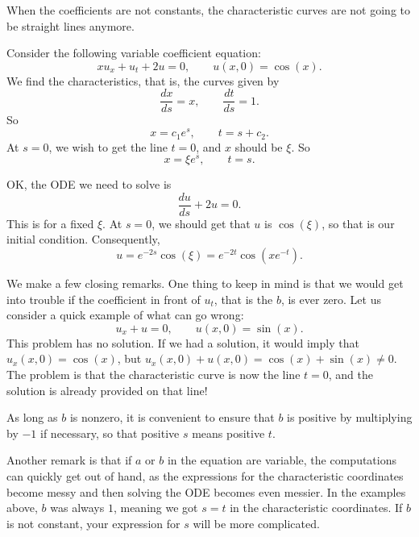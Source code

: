 When the coefficients are not constants, the characteristic curves
are not going to be straight lines anymore.

\begin{example}
Consider the following variable coefficient equation:
\begin{equation*}
x u_x + u_t + 2 u = 0, \qquad u(x,0) = \cos(x) . %
\end{equation*}
We find the characteristics, that is, the curves given by
\begin{equation*}
\frac{dx}{ds} = x, \qquad \frac{dt}{ds} = 1 .
\end{equation*}
So
\begin{equation*}
x = c_1 e^{s} , \qquad t = s+ c_2 .
\end{equation*}
At $s=0$, we wish to get the line $t=0$, and $x$ should be $\xi$.  So
\begin{equation*}
x = \xi e^s, \qquad t = s .
\end{equation*}

OK\@, the ODE we need to solve is
\begin{equation*}
\frac{du}{ds} + 2 u = 0 .
\end{equation*}
This is for a fixed $\xi$.  At $s=0$, we should get that $u$ is
$\cos(\xi)$, so that is our initial condition.  Consequently,
\begin{equation*}
u = e^{-2s} \cos(\xi)= e^{-2t} \cos(xe^{-t}) .
\end{equation*}
\end{example}


We make a few closing remarks.
One thing to keep in mind is that we would get into trouble if the
coefficient in front of $u_t$, that is the $b$, is ever zero.
Let us consider a quick example of what can go wrong:
\begin{equation*}
u_x + u = 0, \qquad u(x,0) = \sin(x).
\end{equation*}
This problem has no solution.  If we had a solution, it
would imply that $u_x(x,0) = \cos(x)$,
but $u_x(x,0) + u(x,0) = \cos(x) + \sin(x) \not= 0$.
The problem is that the characteristic curve is now the line $t=0$,
and the solution is already provided on that line!

As long as $b$ is nonzero,
it is convenient to ensure that $b$ is positive by multiplying by $-1$
if necessary, so that positive $s$ means positive $t$.

Another remark is that if $a$ or $b$ in the equation are variable,
the computations can
quickly get out of hand, as the expressions for the characteristic
coordinates become messy and then solving the ODE becomes even messier.
In the examples above, $b$ was always $1$, meaning we got $s=t$ in the 
characteristic coordinates.  If $b$ is not constant, your expression for $s$
will be more complicated.

